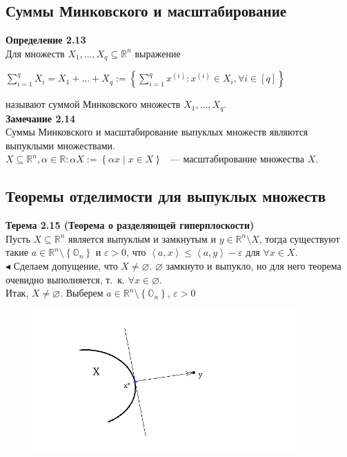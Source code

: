 \subsection{Суммы Минковского и масштабирование}
\textbf{Определение 2.13}\\
Для множеств $X_1,\ldots,X_q\subseteq \mathbb{R}^n$ выражение
\begin{center}
\textbf{$\sum^{q}_{i=1}{X_i} = X_1+\ldots+X_q := \left\{ \sum^{q}_{i=1}{x^{(i)}}: x^{(i)}\in X_i, \forall i \in [q] \right\}$}\\
\end{center}
называют суммой Минковского множеств $X_1,\ldots,X_q$.\\

\noindent\textbf{Замечание 2.14}\\
Суммы Минковского и масштабирование выпуклых множеств являются выпуклыми множествами.\\
\textbf{$X\subseteq \mathbb{R}^n, \alpha \in \mathbb{R}: \alpha X:= \left\{ \alpha x \mid x \in X \right\}$} ~--- масштабирование множества $X$.

\subsection{Теоремы отделимости для выпуклых множеств}
\textbf{Терема 2.15 (Теорема о разделяющей гиперплоскости)}\\
Пусть $X\subseteq \mathbb{R}^n$ является выпуклым и замкнутым и  $y\in \mathbb{R}^n \setminus X$, тогда существуют такие $a\in\mathbb{R}^n\setminus\left\{\mathbb{O}_n\right\}$ и $\varepsilon>0$, что \textbf{$\left \langle a,x \right \rangle \leq \left \langle a,y \right \rangle - \varepsilon$} для $\forall x\in X$.\\

\noindent$\blacktriangleleft$ Сделаем допущение, что $X\neq\varnothing$. $\varnothing$ замкнуто и выпукло, но для него теорема очевидно выполняется, т.~к. $\forall x \in \varnothing$.\\
Итак, $X\neq \varnothing$. Выберем $a\in\mathbb{R}^n\setminus \left \{ \mathbb{O}_n \right \}$, $\varepsilon>0$\\

\begin{figure}[h!]
\centering
\includegraphics[width=0.9\textwidth]{800px-Beweis1}
\label{fig:}
\end{figure}

